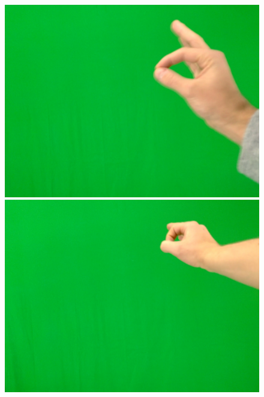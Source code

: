 \begin{figure}[htb]
\begin{minipage}[c]{0.19\linewidth}
   \end{minipage} 
   \begin{minipage}[c]{0.19\linewidth}
      \includegraphics[width=0.95\linewidth]{figures/g2-7.jpg}
   \end{minipage} 
   \begin{minipage}[c]{0.19\linewidth}
      \includegraphics[width=0.95\linewidth]{figures/g2-9.jpg}
   \end{minipage}  \\      
   \vspace{1em}
   \begin{minipage}[c]{0.19\linewidth}

\end{minipage}
\end{figure}
